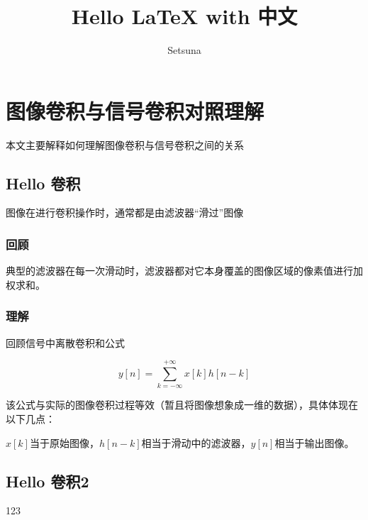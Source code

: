 \documentclass{article}
\title{Hello LaTeX with 中文}
\author{Setsuna}
\begin{document}
\maketitle
\section{图像卷积与信号卷积对照理解}
本文主要解释如何理解图像卷积与信号卷积之间的关系

  \subsection{Hello 卷积}
  图像在进行{卷积}操作时，通常都是由滤波器“滑过”图像

  \subsubsection{回顾}
  典型的滤波器在每一次滑动时，滤波器都对它本身覆盖的图像区域的像素值进行加权求和。

  \subsubsection{理解}
  回顾信号中离散卷积和公式

  $$y\left[ n \right] = \sum\limits_{k =  - \infty }^{ + \infty } {x\left[ k \right]h\left[ {n - k} \right]}$$

  该公式与实际的图像卷积过程等效（暂且将图像想象成一维的数据），具体体现在以下几点：

  ${x\left[ k \right]}$当于原始图像，${h\left[ {n - k} \right]}$相当于滑动中的滤波器，$y\left[ n \right]$相当于输出图像。

  \subsection{Hello 卷积2}
  123
\end{document}
